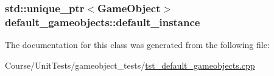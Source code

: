 \hypertarget{classdefault__gameobjects_a4dfa6f390ff4c2c331c342b6c88b16d7}{
\subsubsection[{default\-\_\-instance}]{\setlength{\rightskip}{0pt plus 5cm}std\-::unique\-\_\-ptr$<${\bf Game\-Object}$>$ default\-\_\-gameobjects\-::default\-\_\-instance\hspace{0.3cm}{\ttfamily [private]}}}\label{classdefault__gameobjects_a4dfa6f390ff4c2c331c342b6c88b16d7}


The documentation for this class was generated from the following file\-:\begin{DoxyCompactItemize}
\item 
Course/\-Unit\-Tests/gameobject\-\_\-tests/\hyperlink{tst__default__gameobjects_8cpp}{tst\-\_\-default\-\_\-gameobjects.\-cpp}\end{DoxyCompactItemize}
